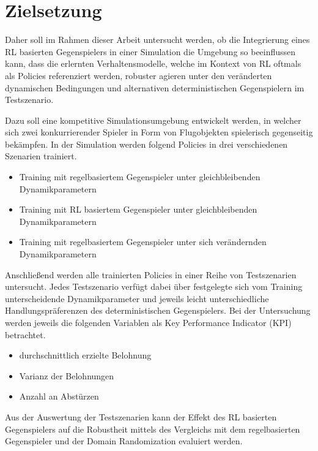 \section{Zielsetzung}

Daher soll im Rahmen dieser Arbeit untersucht werden, ob die Integrierung eines RL basierten Gegenspielers in einer Simulation die Umgebung so beeinflussen kann, dass die erlernten Verhaltensmodelle, welche im Kontext von RL oftmals als Policies referenziert werden, robuster agieren unter den veränderten dynamischen Bedingungen und alternativen deterministischen Gegenspielern im Testszenario. 

Dazu soll eine kompetitive Simulationsumgebung entwickelt werden, in welcher sich zwei konkurrierender Spieler in Form von Flugobjekten spielerisch gegenseitig bekämpfen.
In der Simulation werden folgend Policies in drei verschiedenen Szenarien trainiert.

\begin{itemize}
    \item Training mit regelbasiertem Gegenspieler unter gleichbleibenden Dynamikparametern
    \item Training mit RL basiertem Gegenspieler unter gleichbleibenden Dynamikparametern
    \item Training mit regelbasiertem Gegenspieler unter sich verändernden Dynamikparametern
\end{itemize}

Anschließend werden alle trainierten Policies in einer Reihe von Testszenarien untersucht.
Jedes Testszenario verfügt dabei über festgelegte sich vom Training unterscheidende Dynamikparameter und jeweils leicht unterschiedliche Handlungspräferenzen des deterministischen Gegenspielers.
Bei der Untersuchung werden jeweils die folgenden Variablen als Key Performance Indicator (KPI) betrachtet.
\begin{itemize}
    \item durchschnittlich erzielte Belohnung
    \item Varianz der Belohnungen
    \item Anzahl an Abstürzen
\end{itemize}

Aus der Auswertung der Testszenarien kann der Effekt des RL basierten Gegenspielers auf die Robustheit mittels des Vergleichs mit dem regelbasierten Gegenspieler und der Domain Randomization evaluiert werden.

